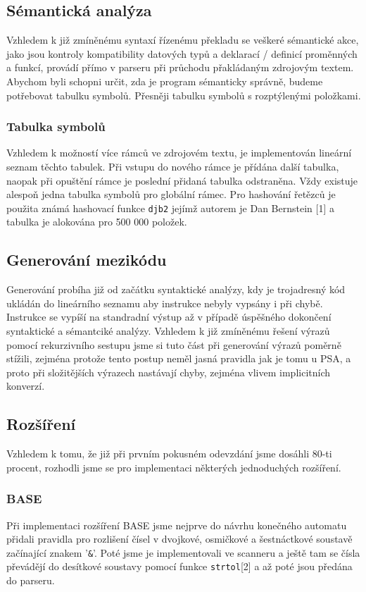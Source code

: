 \documentclass[11pt, titlepage, a4paper]{article}
\begin{document}
		\subsection{Sémantická analýza}
		\indent \indent Vzhledem k již zmíněnému syntaxí řízenému překladu se veškeré sémantické akce, jako jsou kontroly kompatibility datových typů
		a deklarací / definicí proměnných a funkcí, provádí přímo v parseru při průchodu přakládaným zdrojovým textem.
		Abychom byli schopni určit, zda je program sémanticky správně, budeme potřebovat tabulku symbolů. Přesněji tabulku symbolů s rozptýlenými
		položkami.

		\subsubsection{Tabulka symbolů}
		\indent \indent Vzhledem k možností více rámců ve zdrojovém textu, je implementován lineární seznam těchto tabulek. Při vstupu do nového rámce
		je přídána další tabulka, naopak při opuštění rámce je poslední přidaná tabulka odstraněna. Vždy existuje alespoň jedna tabulka symbolů pro
		globální rámec.
		Pro hashování řetězců je použita známá hashovací funkce \texttt{djb2} jejímž autorem je Dan Bernstein [1] a tabulka je alokována pro
		500 000 položek.

		\subsection{Generování mezikódu}
		Generování probíha již od začátku syntaktické analýzy, kdy je trojadresný kód ukládán do lineárního seznamu aby instrukce nebyly vypsány i při chybě.
		Instrukce se vypíší na standradní výstup až v případě úspěšného dokončení syntaktické a sémantciké analýzy.
		Vzhledem k již zmíněnému řešení výrazů pomocí rekurzivního sestupu jsme si tuto část při generování výrazů poměrně stížili, zejména protože
		tento postup neměl jasná pravidla jak je tomu u PSA, a proto při složitějších výrazech nastávají chyby, zejména vlivem implicitních
		konverzí.

		\subsection{Rozšíření}
		\indent \indent Vzhledem k tomu, že již při prvním pokusném odevzdání jsme dosáhli 80-ti procent, rozhodli jsme se pro implementaci
		některých jednoduchých rozšíření.

		\subsubsection{BASE}
		\indent \indent Při implementaci rozšíření BASE jsme nejprve do návrhu konečného automatu přidali pravidla pro rozlišení čísel v dvojkové,
		osmičkové a šestnáctkové
		soustavě začínající znakem '\texttt{\&}'. Poté jsme je implementovali ve scanneru a ještě tam se čísla převádějí do desítkové soustavy pomocí funkce
		\texttt{strtol}[2] a až poté jsou předána do parseru.
\end{document}

